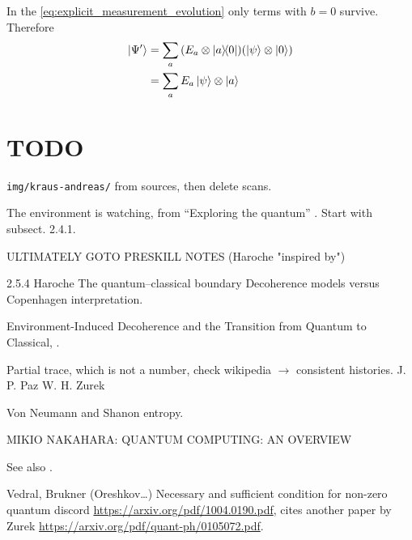 
In the \ref{eq:explicit_measurement_evolution} only terms with $b=0$ survive.
Therefore
\begin{align*}
  \ket{\Psi^{\prime}} &= \sum_a \qty(E_a\otimes\ketbra{a}{0}) \qty(\ket{\psi}\otimes\ket{0}) \\
                      &= \sum_a E_a \ket{\psi} \otimes \ket{a}
\end{align*}

\section{TODO}

\texttt{img/kraus-andreas/} from sources,
then delete scans.

The environment is watching, from ``Exploring the quantum''
\parencite[Ch. 4]{Haroche_Exploring}. Start with subsect. 2.4.1.

ULTIMATELY GOTO PRESKILL NOTES (Haroche "inspired by")

2.5.4 Haroche The quantum–classical boundary
Decoherence models versus Copenhagen interpretation.

Environment-Induced Decoherence and the Transition from Quantum to Classical,
\cite{Zurek_Fundamentals}.

Partial trace, which is not a number, check wikipedia $\rightarrow$ consistent histories.
J. P. Paz W. H. Zurek

Von Neumann and Shanon entropy.

MIKIO NAKAHARA: QUANTUM COMPUTING: AN OVERVIEW

See also \cite{Schlosshauer_Decoherence}.

Vedral, Brukner (Oreshkov\dots)
Necessary and sufficient condition for non-zero quantum discord
\url{https://arxiv.org/pdf/1004.0190.pdf},
cites another paper by Zurek \url{https://arxiv.org/pdf/quant-ph/0105072.pdf}.
